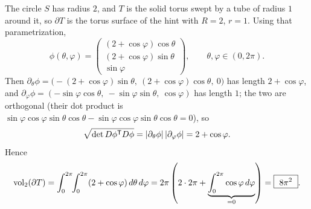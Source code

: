 \begin{exercisesolution}
\label{sol:torus_surface_area}
The circle $S$ has radius $2$, and $T$ is the solid torus swept by a tube of radius $1$
around it, so $\partial T$ is the torus surface of the hint with $R=2$, $r=1$. Using that
parametrization,
\[\phi(\theta,\varphi) = \begin{pmatrix}(2+\cos\varphi)\cos\theta\\
  (2+\cos\varphi)\sin\theta\\ \sin\varphi\end{pmatrix}, \qquad \theta,\varphi\in(0,2\pi).\]
Then $\partial_\theta\phi = \big(-(2+\cos\varphi)\sin\theta,\ (2+\cos\varphi)\cos\theta,\
0\big)$ has length $2+\cos\varphi$, and $\partial_\varphi\phi = (-\sin\varphi\cos\theta,\
-\sin\varphi\sin\theta,\ \cos\varphi)$ has length $1$; the two are orthogonal (their dot
product is $\sin\varphi\cos\varphi\sin\theta\cos\theta - \sin\varphi\cos\varphi\sin\theta
\cos\theta = 0$), so
\[\sqrt{\det D\phi^{\mathsf{T}} D\phi} = \lvert\partial_\theta\phi\rvert\,\lvert\partial_\varphi\phi
  \rvert = 2+\cos\varphi.\]
Hence
\[\operatorname{vol}_2(\partial T) = \int_0^{2\pi}\!\!\int_0^{2\pi} (2+\cos\varphi)\,d\theta\,d\varphi
  = 2\pi\left(2\cdot2\pi + \underbrace{\int_0^{2\pi}\cos\varphi\,d\varphi}_{=0}\right)
  = \boxed{\ 8\pi^2\ }.\]
\end{exercisesolution}

